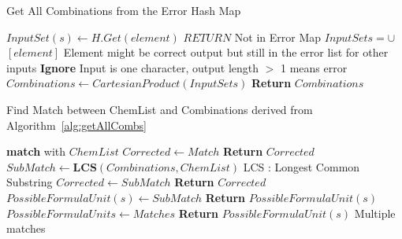 \begin{algorithm}
\small
\caption{Get All Combinations from the Error Hash Map}
\begin{algorithmic}[1]
		\State $InputSet(s) \leftarrow H.Get(element)$ 
			\State $RETURN$ \Comment Not in Error Map
		\Else
				\State $InputSets =\cup$ $[element]$ 
				\Statex \Comment Element might be correct output but still in the error list for other inputs
			\Else
				\State \textbf{Ignore}
				\Statex \Comment Input is one character, output length $>$ 1 means error
			\EndIf
		\EndIf
	\EndFor
\State $Combinations \leftarrow CartesianProduct(InputSets)$ %
\State  \textbf{Return} {$Combinations$}
\EndProcedure
\Statex
\end{algorithmic}
\label{alg:getAllCombs}
\end{algorithm}

\begin{algorithm}
\small
\caption{Find Match between ChemList and Combinations derived from Algorithm~\ref{alg:getAllCombs}}
\begin{algorithmic}[1]
		\State \textbf{match} {with $ChemList$}
	\EndFor
		\State $Corrected \leftarrow Match$
		\State  \textbf{Return} {$Corrected$}
		\State $SubMatch \leftarrow \textbf{LCS}(Combinations,ChemList)$ 
		\Statex \Comment LCS : Longest Common Substring
			\State $Corrected \leftarrow SubMatch$
			\State  \textbf{Return} {$Corrected$}
		\Else
			\State $PossibleFormulaUnit(s) \leftarrow SubMatch$
			\State  \textbf{Return} {$PossibleFormulaUnit(s)$}
		\EndIf
	\Else
		\State $PossibleFormulaUnits \leftarrow Matches$
		\State  \textbf{Return} {$PossibleFormulaUnit(s)$}
		\Statex \Comment Multiple matches
	\EndIf
\EndProcedure
\end{algorithmic}
\label{alg:findMatch}
\end{algorithm}

